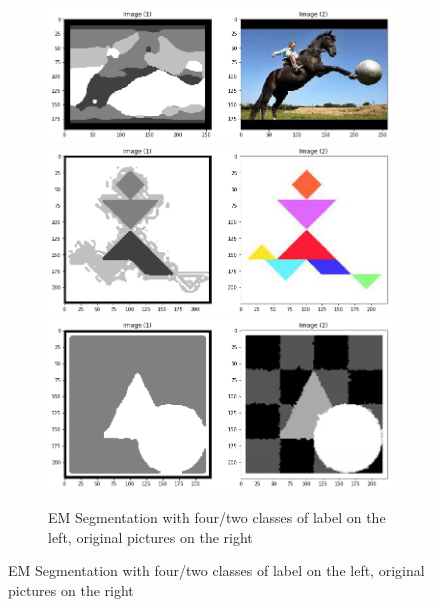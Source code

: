 \documentclass[twoside,10.5pt]{article}
\begin{document}
\begin{figure}[t!]
\label{fg:1}
\centering
    \begin{subfigure}[b]{0.45\textwidth}
        \centering
        \includegraphics[width=.95\linewidth]{horse_result.png}
        \includegraphics[width=.95\linewidth]{person_result.png}
        \\[\baselineskip]%
        \includegraphics[width=.95\linewidth]{circle_result.png}
        \caption{EM Segmentation with four/two classes of label on the left, original pictures on the right}
    \end{subfigure}

\end{figure}
\end{document}
